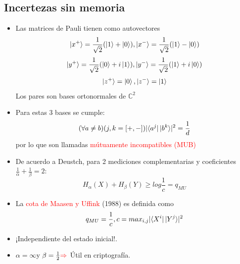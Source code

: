 \documentclass{book}
\begin{document}
\subsection{Incertezas sin memoria}
\begin{itemize}
    \item Las matrices de Pauli tienen como autovectores
    \begin{equation}\label{eq4.8}\ket{x^+}=\frac{1}{\sqrt{2}}(\ket{1}+\ket{0}), \ket{x^-}=\frac{1}{\sqrt{2}}(\ket{1}-\ket{0})\end{equation}
    \begin{equation}\label{eq4.9}\ket{y^+}=\frac{1}{\sqrt{2}}(\ket{0}+i\ket{1}), \ket{y^-}=\frac{1}{\sqrt{2}}(\ket{1}+i\ket{0})\end{equation}
    \begin{equation}\label{eq4.10}\ket{z^+}=\ket{0}, \ket{z^-}=\ket{1}\end{equation}
    Los pares son bases ortonormales de $\mathbb{C}^2$
    \item Para estas 3 bases se cumple:
    \begin{equation}\label{eq4.11}(\forall a\neq b)(j,k=[+,-]) \lvert\bra{a^j}\ket{b^k}\rvert^2=\frac{1}{d}\end{equation}
    por lo que son llamadas \textcolor{red}{mútuamente incompatibles (MUB)}
    \item De acuerdo a Deustch, para 2 mediciones complementarias y coeficientes $\frac{1}{\alpha}+\frac{1}{\beta}=2$:
    \begin{equation}\label{eq4.12}H_\alpha(X)+H_\beta(Y)\geq log \frac{1}{c}=q_{MU}\end{equation}
    \item La \textcolor{red}{cota de Maasen y Uffink} (1988) es definida como \begin{equation} \label{eq4.13}q_{MU}=\frac{1}{c}, c=max_{i,j}\lvert\bra{X^i}\ket{Y^j}\rvert^2\end{equation}
    \item ¡Independiente del estado inicial!.
    \item $\alpha=\infty$y $\beta=\frac{1}{2}\textcolor{red}{\Rightarrow}$ Útil en criptografía.
\end{itemize}
\end{document}
